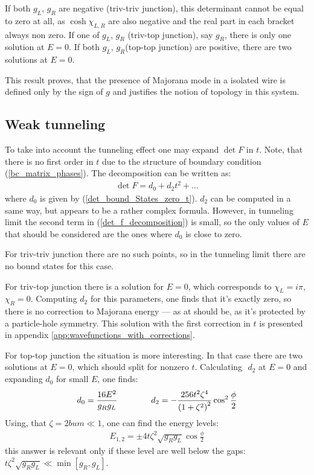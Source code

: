 If both $ g_L $, $ g_R $ are negative (triv-triv junction), this determinant cannot be equal to zero at all, as $ \cosh \chi_{L,R} $ are also negative and the real part in each bracket always non zero.  If one of $ g_L $, $ g_R $ (triv-top junction), say $ g_R $,	 there is only one solution at $ E=0 $. If both $ g_L $, $ g_R $(top-top junction) are positive, there are two solutions at $ E=0 $.

This result proves, that the presence of Majorana mode in a isolated wire is defined only by the sign of $ g $ and justifies the notion of  topology in this system.

\subsection{Weak tunneling}
To take into account the tunneling effect one may expand $ \det F $ in $ t $. Note, that there is no first order in $ t $ due to the structure of boundary condition (\ref{bc_matrix_phases}). The decomposition can be written as:
\begin{gather}
\label{det_f_decomposition}
	\det F
	=
	d_0
	+
	d_2t^2
	+
	\dots
\end{gather}
where $ d_0 $ is given by (\ref{det_bound_States_zero_t}). $ d_2 $ can be computed in a same way, but appears to be  a rather complex formula.  However, in tunneling limit the second term in (\ref{det_f_decomposition}) is small, so the only values of $ E $ that should be considered are the ones where $ d_0 $ is close to zero.

For triv-triv junction there are no such points, so in the tunneling limit there are no bound states for this case.

For triv-top junction there is a solution for $ E=0 $, which corresponds to $ \chi_L=i \pi $, $ \chi_R=0 $. Computing $ d_2 $ for this parameters, one finds that it's exactly zero, so there is no correction to Majorana energy --- as at should be, as it's protected by a particle-hole symmetry. This solution with the first correction in $ t $ is presented in appendix \ref{app:wavefunctions_with_corrections}.

For top-top junction the situation is more interesting. In that case there are two solutions at $ E=0 $, which should split for nonzero $ t $. Calculating $  $ $ d_2 $ at $ E=0 $ and expanding $ d_0 $ for small $ E $, one finds:
\begin{gather}
d_0=\frac{16E^2}{g_Rg_L}
\qquad\qquad
	d_2 = -\frac{256t^2\zeta^4}{\left(1+\zeta^2\right)^2}\cos^2\frac{\phi}{2}
\end{gather}
Using, that $ \zeta=2bum\ll1 $, one can find the energy levels:
\begin{gather}
	E_{1,2}
	=
	\pm
	4t\zeta^2\sqrt{g_Rg_L}\cos\frac{\phi}{2}
\end{gather}
this answer is relevant only if these level are well below the gaps: $ t\zeta^2\sqrt{g_Rg_L}\ll\min\left[g_R,g_L\right] $.
